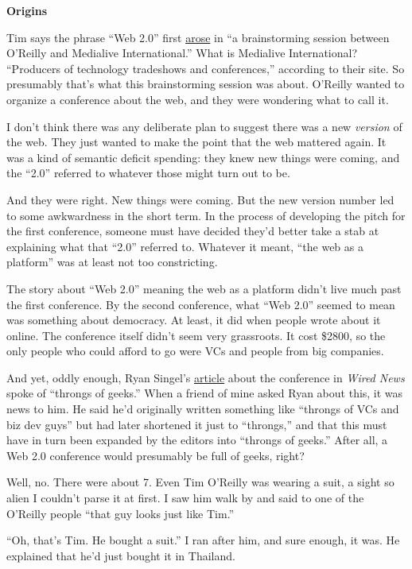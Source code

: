 \documentclass[12pt]{book}
\begin{document}
\textbf{Origins}

Tim says the phrase ``Web 2.0'' first
\href{http://www.oreillynet.com/pub/a/oreilly/tim/news/2005/09/30/what-is-web-20\%20.html}{arose}
in ``a brainstorming session between O'Reilly and Medialive
International.'' What is Medialive International? ``Producers of
technology tradeshows and conferences,'' according to their site. So
presumably that's what this brainstorming session was about. O'Reilly
wanted to organize a conference about the web, and they were wondering
what to call it.

I don't think there was any deliberate plan to suggest there was a new
\emph{version} of the web. They just wanted to make the point that the
web mattered again. It was a kind of semantic deficit spending: they
knew new things were coming, and the ``2.0'' referred to whatever those
might turn out to be.

And they were right. New things were coming. But the new version number
led to some awkwardness in the short term. In the process of developing
the pitch for the first conference, someone must have decided they'd
better take a stab at explaining what that ``2.0'' referred to. Whatever
it meant, ``the web as a platform'' was at least not too constricting.

The story about ``Web 2.0'' meaning the web as a platform didn't live
much past the first conference. By the second conference, what ``Web
2.0'' seemed to mean was something about democracy. At least, it did
when people wrote about it online. The conference itself didn't seem
very grassroots. It cost \$2800, so the only people who could afford to
go were VCs and people from big companies.

And yet, oddly enough, Ryan Singel's
\href{http://www.wired.com/news/technology/0,1282,69114,00.html}{article}
about the conference in \emph{Wired News} spoke of ``throngs of geeks.''
When a friend of mine asked Ryan about this, it was news to him. He said
he'd originally written something like ``throngs of VCs and biz dev
guys'' but had later shortened it just to ``throngs,'' and that this
must have in turn been expanded by the editors into ``throngs of
geeks.'' After all, a Web 2.0 conference would presumably be full of
geeks, right?

Well, no. There were about 7. Even Tim O'Reilly was wearing a suit, a
sight so alien I couldn't parse it at first. I saw him walk by and said
to one of the O'Reilly people ``that guy looks just like Tim.''

``Oh, that's Tim. He bought a suit.'' I ran after him, and sure enough,
it was. He explained that he'd just bought it in Thailand.
\end{document}
